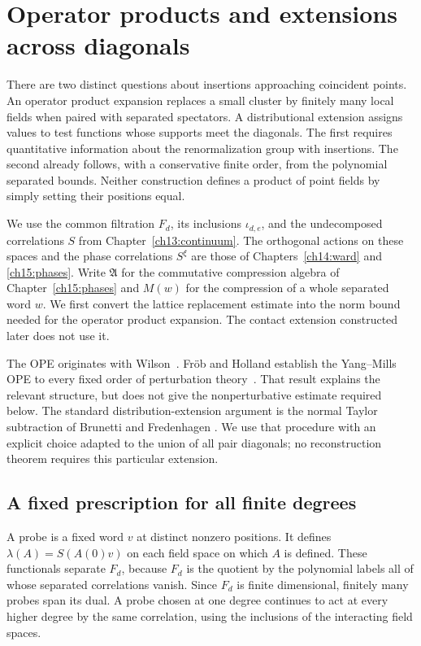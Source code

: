 \chapter[Operator products and contact extensions]{Operator products and extensions across diagonals}
\label{ch18:products}

There are two distinct questions about insertions approaching coincident points. An operator
product expansion replaces a small cluster by finitely many local fields
when paired with separated spectators. A distributional extension
assigns values to test functions whose supports meet the diagonals. The first requires
quantitative information about the renormalization group with insertions. The
second already follows, with a conservative finite order, from the
polynomial separated bounds. Neither construction defines a product of
point fields by simply setting their positions equal.

We use the common filtration $F_d$, its inclusions $\iota_{d,e}$,
and the undecomposed correlations $S$ from Chapter~\ref{ch13:continuum}.
The orthogonal actions on these spaces and the phase correlations
$S^\xi$ are those of Chapters~\ref{ch14:ward} and
\ref{ch15:phases}. Write $\mathfrak A$ for the
commutative compression algebra of Chapter~\ref{ch15:phases} and
$M(w)$ for the compression of a whole separated word $w$.
We first convert the lattice replacement estimate into the norm
bound needed for the operator product expansion. The contact extension constructed later does not use it.

The OPE originates with Wilson~\cite{Wilson1969}.
Fr\"ob and Holland establish the Yang--Mills OPE to every fixed order
of perturbation theory~\cite{FrobHolland2016}. That result explains the
relevant structure, but does not give the nonperturbative estimate
required below. The standard distribution-extension argument is the
normal Taylor subtraction of Brunetti and Fredenhagen
\cite[Section~5.2, Theorems~5.2--5.3]{BrunettiFredenhagen2000}.
We use that procedure with an explicit choice adapted to the union of
all pair diagonals; no reconstruction theorem requires this particular
extension.

\section{A fixed prescription for all finite degrees}
\label{ch18:prescription}

A probe is a fixed word $v$ at distinct nonzero positions. It defines
$\lambda(A)=S(A(0)v)$ on each field space on which $A$ is defined.
These functionals separate $F_d$, because $F_d$ is the quotient by the
polynomial labels all of whose separated correlations vanish. Since $F_d$ is finite dimensional, finitely many probes span
its dual. A probe chosen at one degree continues to act at every higher
degree by the same correlation, using the inclusions of the interacting field spaces.

